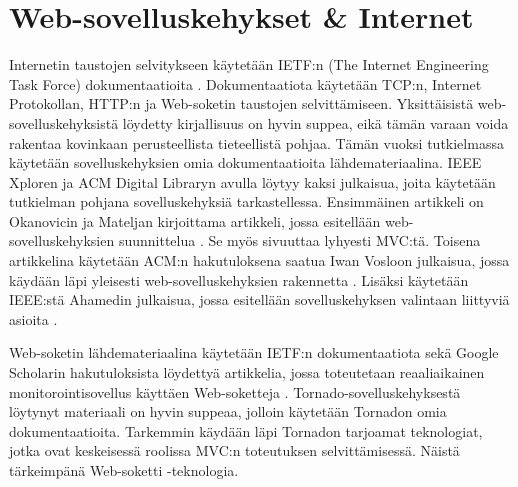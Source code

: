 \documentclass[utf8]{gradu3}
\begin{document}
\section{Web-sovelluskehykset \& Internet}
Internetin taustojen selvitykseen käytetään IETF:n (The Internet Engineering Task Force) dokumentaatioita \parencite{ietf}. Dokumentaatiota käytetään TCP:n, Internet Protokollan, HTTP:n ja Web-soketin taustojen selvittämiseen. Yksittäisistä web-sovelluskehyksistä löydetty kirjallisuus on hyvin
suppea, eikä tämän varaan voida rakentaa kovinkaan perusteellista
tieteellistä pohjaa. Tämän vuoksi tutkielmassa käytetään
sovelluskehyksien omia dokumentaatioita lähdemateriaalina. IEEE Xploren ja ACM Digital Libraryn avulla löytyy kaksi julkaisua, 
joita käytetään tutkielman pohjana sovelluskehyksiä
tarkastellessa. Ensimmäinen artikkeli on Okanovicin ja Mateljan
kirjoittama artikkeli, jossa esitellään web-sovelluskehyksien suunnittelua \parencite{ockanovic}. 
Se myös sivuuttaa lyhyesti MVC:tä. Toisena artikkelina käytetään ACM:n hakutuloksena saatua Iwan
Vosloon julkaisua, jossa käydään läpi yleisesti web-sovelluskehyksien
rakennetta \parencite{vosloo}. Lisäksi käytetään
IEEE:stä Ahamedin julkaisua, jossa esitellään sovelluskehyksen valintaan liittyviä asioita \parencite{towards_framework}.

Web-soketin lähdemateriaalina käytetään IETF:n dokumentaatiota \parencite{websocket} sekä Google Scholarin hakutuloksista löydettyä artikkelia, jossa toteutetaan reaaliaikainen monitorointisovellus käyttäen Web-soketteja \parencite{websocket_ajax}. Tornado-sovelluskehyksestä löytynyt materiaali on hyvin suppeaa, jolloin käytetään Tornadon omia dokumentaatioita. Tarkemmin käydään läpi Tornadon tarjoamat teknologiat, jotka ovat keskeisessä roolissa MVC:n toteutuksen selvittämisessä. Näistä tärkeimpänä Web-soketti -teknologia.
\end{document}
